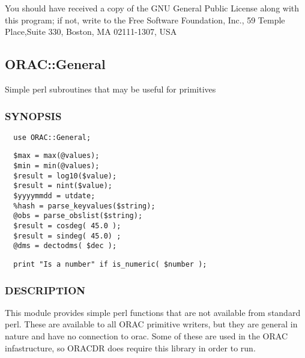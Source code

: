 You should have received a copy of the GNU General Public License along with
this program; if not, write to the Free Software Foundation, Inc., 59 Temple
Place,Suite 330, Boston, MA  02111-1307, USA

\subsection{ORAC::General\label{ORAC::General}}


Simple perl subroutines that may be useful for primitives

\subsubsection*{SYNOPSIS\label{ORAC::General_SYNOPSIS}}
\begin{verbatim}
  use ORAC::General;
\end{verbatim}
\begin{verbatim}
  $max = max(@values);
  $min = min(@values);
  $result = log10($value);
  $result = nint($value);
  $yyyymmdd = utdate;
  %hash = parse_keyvalues($string);
  @obs = parse_obslist($string);
  $result = cosdeg( 45.0 );
  $result = sindeg( 45.0) ;
  @dms = dectodms( $dec );
\end{verbatim}
\begin{verbatim}
  print "Is a number" if is_numeric( $number );
\end{verbatim}
\subsubsection*{DESCRIPTION\label{ORAC::General_DESCRIPTION}}


This module provides simple perl functions that are not available
from standard perl. These are available to all ORAC primitive writers,
but they are general in nature and have no connection to orac. Some of
these are used in the ORAC infastructure, so ORACDR does require this
library in order to run.

